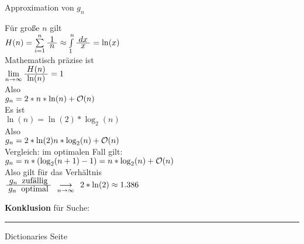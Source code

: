 
\begin{slide}{}
\normalsize

\begin{center}
Approximation von $g_n$
\end{center}
\vspace*{0.5cm}

\footnotesize
F\"ur gro{\ss}e $n$ gilt \\[0.3cm]
\hspace*{1.3cm} $H(n) = \sum\limits_{i=1}^n \frac{\displaystyle\;1\;}{\displaystyle\;n\;} \approx \int\limits_1^n \frac{\displaystyle\;dx\;}{\displaystyle\;x\;} = \ln(x)$ \\[0.3cm]
Mathematisch pr\"azise ist \\[0.3cm]
\hspace*{1.3cm} $\lim\limits_{n\rightarrow\infty} \frac{\displaystyle\;H(n)\;}{\displaystyle\;\ln(n)\;} = 1$ \\[0.3cm]
Also \\[0.3cm]
\hspace*{1.3cm} $g_n = 2 * n * \ln(n) + \mathcal{O}(n)$ \\[0.3cm]
Es ist \\[0.3cm]
\hspace*{1.3cm} $\ln(n) = \ln(2) * \log_2(n)$ \\[0.3cm]
Also \\[0.3cm]
\hspace*{1.3cm} $g_n = 2 * \ln(2) n * \log_2(n) + \mathcal{O}(n)$ \\[0.3cm]
Vergleich: im optimalen Fall gilt: \\[0.3cm]
\hspace*{1.3cm} $g_n = n * (\log_2(n+1)-1)= n * \log_2(n) + \mathcal{O}(n)$ \\[0.3cm]
Also gilt f\"ur das Verh\"altnis \\[0.3cm]
\hspace*{1.3cm} $\frac{\displaystyle\;g_n\;\; \mbox{zuf\"allig}\;}{\displaystyle\;g_n\;\; \mbox{optimal}\;} \;\;_{\displaystyle \longrightarrow \atop {\scriptstyle n \rightarrow \infty}}\;\; 2 * \ln(2) \approx 1.386$

\textbf{Konklusion} f\"ur Suche: \\[0.9cm]
\hspace*{0.3cm} 


\vspace*{0.3cm}

\vspace*{\fill}
\tiny \addtocounter{mypage}{1}
\rule{17cm}{1mm}
Dictionaries  \hspace*{\fill} Seite 
\end{slide}

